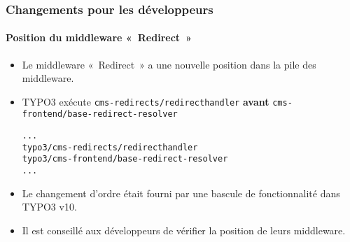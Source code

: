 %

\begin{frame}[fragile]
	\frametitle{Changements pour les développeurs}
	\framesubtitle{Position du middleware «~Redirect~»}

	\lstset{basicstyle=\tiny\ttfamily}

	\begin{itemize}
		\item Le middleware «~Redirect~» a une nouvelle position dans la pile des middleware.
		\item TYPO3 exécute
			\small\texttt{cms-redirects/redirecthandler}\normalsize\newline
			\textbf{avant}
			\texttt{cms-frontend/base-redirect-resolver}\normalsize
\begin{lstlisting}
...
typo3/cms-redirects/redirecthandler
typo3/cms-frontend/base-redirect-resolver
...
\end{lstlisting}

		\item Le changement d'ordre était fourni par une bascule de fonctionnalité dans TYPO3 v10.
		\item Il est conseillé aux développeurs de vérifier la position de leurs middleware.

	\end{itemize}

\end{frame}

